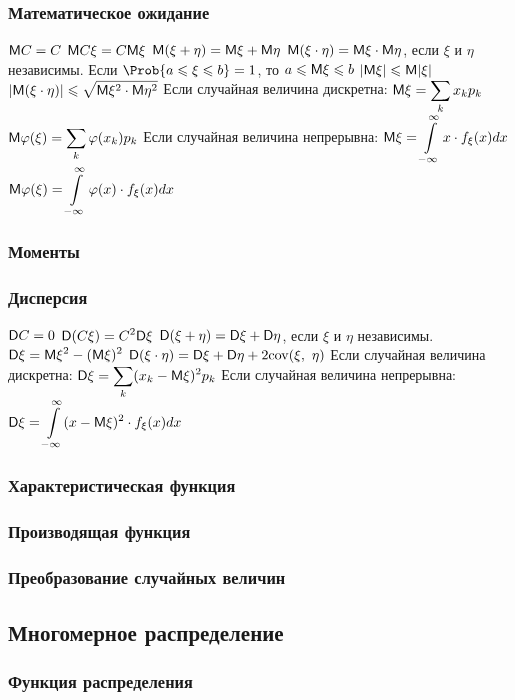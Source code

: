 \subsubsection{Математическое ожидание}
$\displaystyle \mathsf{M} C = C $
$\displaystyle \mathsf{M} C\xi = C \mathsf{M} \xi $
$\displaystyle \mathsf{M}(\xi + \eta) = \mathsf{M}\xi + \mathsf{M}\eta $
$\displaystyle \mathsf{M}(\xi\cdot\eta) = \mathsf{M}\xi \cdot \mathsf{M}\eta $, если $\xi$ и $\eta$ независимы.
Если $\displaystyle \Prob\{a\leqslant \xi \leqslant b\} = 1 $, то $a\leqslant \mathsf{M}\xi \leqslant b$
$\displaystyle |\mathsf{M}\xi| \leqslant \mathsf{M}|\xi| $
$\displaystyle |\mathsf{M}(\xi\cdot\eta)| \leqslant \sqrt{\mathsf{M}\xi^2\cdot\mathsf{M}\eta^2} $
Если случайная величина дискретна:
$\displaystyle \mathsf{M}\xi = \sum_k x_k p_k $
$\displaystyle \mathsf{M}\varphi(\xi) = \sum_k \varphi(x_k) p_k $
Если случайная величина непрерывна:
$\displaystyle \mathsf{M}\xi = \int\limits_{-\infty}^{\infty} x\cdot f_\xi(x) dx $
$\displaystyle \mathsf{M}\varphi(\xi) = \int\limits_{-\infty}^{\infty} \varphi(x)\cdot f_\xi(x) dx $
\subsubsection{Моменты}
\subsubsection{Дисперсия}
$\displaystyle \mathsf{D} C = 0 $
$\displaystyle \mathsf{D}(C\xi) = C^2\mathsf{D}\xi $
$\displaystyle \mathsf{D}(\xi+\eta) = \mathsf{D}\xi + \mathsf{D}\eta $, если $\xi$ и $\eta$ независимы.
$\displaystyle \mathsf{D}\xi = \mathsf{M}\xi^2 - (\mathsf{M}\xi)^2 $
$\displaystyle \mathsf{D}(\xi\cdot\eta) = \mathsf{D}\xi + \mathsf{D}\eta + 2\mathrm{cov}(\xi,\ \eta) $
Если случайная величина дискретна:
$\displaystyle \mathsf{D}\xi = \sum_k (x_k - \mathsf{M}\xi)^2 p_k $
Если случайная величина непрерывна:
$\displaystyle \mathsf{D}\xi = \int\limits_{-\infty}^{\infty} (x-\mathsf{M}\xi)^2\cdot f_\xi(x) dx $
\subsubsection{Характеристическая функция}
\subsubsection{Производящая функция}
\subsubsection{Преобразование случайных величин}
\subsection{Многомерное распределение}
\subsubsection{Функция распределения}
